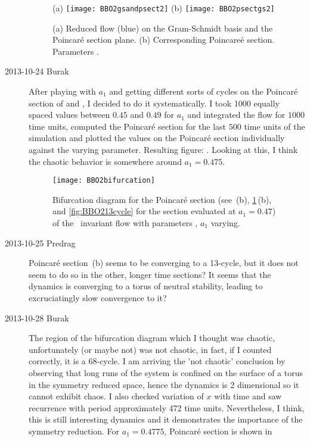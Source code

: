 \begin{description}
\begin{figure}%
\centering
 (a) \texttt{[image: BBO2gsandpsect2]}
 (b) \texttt{[image: BBO2psectgs2]}
\caption{(a) Reduced flow (blue) on the Gram-Schmidt basis and the Poincar\'e
section plane. (b) Corresponding Poincare\'e section. Parameters .
}
\label{fig:BBO2Psect2}
\end{figure}


\item[2013-10-24 Burak] After playing with $a_1$ and getting different sorts
of cycles on the Poincar\'e section of  and ,
I decided to do it systematically. I took 1000 equally spaced values between
$0.45$ and $0.49$ for $a_1$ and integrated the flow for $1000$ time units,
computed the Poincar\'e section for the last $500$ time units of the simulation
and plotted the values on the Poincar\'e section individually against the varying parameter.
Resulting figure: . Looking at this, I think the
chaotic behavior is somewhere around $a_1 = 0.475$.

\begin{figure}%
  \begin{center}
  \texttt{[image: BBO2bifurcation]}
  \end{center}
  \caption{
Bifurcation diagram for the Poincar\'e section (see
\,(b), \ref{fig:BBO2Psect2}\,(b), and
\ref{fig:BBO213cycle} 	for the section
evaluated at $a_1 = 0.47$)
of the \ invariant flow with parameters ,
$a_1$ varying.
    }
  \label{fig:BBO2bifurcation}
\end{figure}

\item[2013-10-25 Predrag]
Poincar\'e section \,(b) seems to be converging to
a 13-cycle, but it does not seem to do so in the other, longer time
sections? It seems that the dynamics is converging to a torus of neutral
stability, leading to excruciatingly slow convergence to it?

\item[2013-10-28 Burak] %
The region of the bifurcation diagram  which I
thought was chaotic, unfortunately (or maybe not) was not chaotic, in fact, if
I counted correctly, it is a 68-cycle. I am arriving the 'not chaotic' conclusion
by observing that long runs of the system is confined on the surface of a torus
in the symmetry reduced space, hence the dynamics is 2 dimensional so it
cannot exhibit chaos. I also checked variation of $x$ with time and saw recurrence
with period approximately 472 time units. Nevertheless, I think, this is still
interesting dynamics and it demonstrates the importance of the symmetry reduction.
For $a_1 = 0.4775$, Poincar\'e section is shown in 


\end{description}
